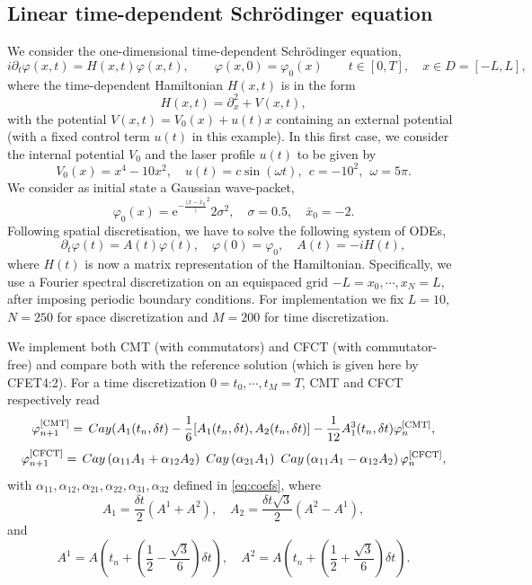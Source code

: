\documentclass{article}
\newcommand{\Cay}{\,{\rm Cay}}
\begin{document}
{%
\subsection{Linear time-dependent Schrödinger equation}
\label{Ex:2}

We consider the one-dimensional time-dependent Schrödinger equation,
%
\begin{equation}
\label{eq:SE}
i\partial_t \varphi(x,t) = H(x,t)\varphi(x,t), \quad \quad \varphi(x,0) = \varphi_0(x) \quad \quad t \in [0,T], \quad x \in D = [-L,L],
\end{equation}
%
where the time-dependent Hamiltonian $H(x,t)$ is in the form
%
\[
H(x,t) = \partial_x^2 + V(x, t), 
\]
%
with the potential $V(x,t) = V_0(x) + u(t)x$ containing an external potential (with a fixed control term $u(t)$ in this example). 
In this first case, we consider the internal potential $V_0$ and the laser profile $u(t)$ to be given by
%
\[
V_0(x) = x^4 - 10 x^2, \quad u(t) = c \sin(\omega t), ~~ c =-10^2, ~~ \omega = 5\pi. 
\]
%
We consider as initial state a Gaussian wave-packet, 
%
\[
\varphi_0(x) = \mathrm{e}^{-\frac{(x-\bar x_0})^2}{2\sigma^2}, \quad \sigma = 0.5, \quad {\bar x_0} = -2.
\]
%
Following spatial discretisation, we have to solve the following system of ODEs,
%
\[
\partial_t \varphi(t) = A(t)\varphi(t), \quad \varphi(0) = \varphi_0, \quad A(t) = -i H(t),
\]
where $H(t)$ is now a matrix representation of the Hamiltonian. Specifically, we use a Fourier spectral discretization on an equispaced grid $-L = x_0, \cdots, x_N = L$, after imposing periodic boundary conditions. {For implementation we fix $L=10$, $N = 250$ for space discretization and $M=200$ for time discretization.} 

%
We implement both CMT (with commutators) and CFCT (with commutator-free) and compare both with the reference solution (which is given here by CFET4:2). 
For a time discretization $0 = t_0, \cdots, t_M = T$, CMT and CFCT respectively read
%
\[
\varphi^{\mathrm{[CMT]}}_{n+1} = \Cay(A_1(t_n, \delta t) - \frac{1}{6}[A_1(t_n, \delta t), A_2(t_n, \delta t)] - \frac{1}{12} A_1^3(t_n, \delta t)\varphi^{\mathrm{[CMT]}}_n,
\]
%
\[
\varphi^{\mathrm{[CFCT]}}_{n+1} = \Cay \left(\alpha_{11}A_1 + \alpha_{12}A_2 \right) \, \Cay \left(\alpha_{21}A_1\right) \, \Cay \left(\alpha_{11}A_1 - \alpha_{12}A_2\right) \varphi^{\mathrm{[CFCT]}}_{n},
\]
%
with $\alpha_{11}, \alpha_{12}, \alpha_{21}, \alpha_{22}, \alpha_{31}, \alpha_{32}$ defined in \eqref{eq:coefs}, where
%
\[
A_1 = \frac{\delta t}{2}(A^1 + A^2), \quad  A_2 = \frac{\delta t\sqrt{3}}{2}(A^2 - A^1),
\]
%
and
%
\[
A^1 = A\left(t_n + \left(\frac{1}{2}-\frac{\sqrt{3}}{6} \right) \delta t\right), \quad A^2 = A\left(t_n + \left(\frac{1}{2}+\frac{\sqrt{3}}{6} \right) \delta t \right).
\]
%

}
\end{document}
